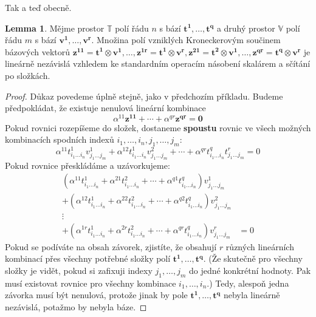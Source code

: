 \documentclass[a5paper,12pt]{amsbook}
\theoremstyle{definition}
\newtheorem{lemma}[theorem]{Lemma}
\newcommand{\myvec}[1]{\mathbf{#1}}
\newcommand{\myspace}[1]{\mathbb{#1}}
\begin{document}
\noindent
Tak a teď obecně.

\begin{lemma}
Mějme prostor $\myspace{T}$ polí řádu $n$ s bází $\myvec{t^1},\hdots,\myvec{t^q}$
a druhý prostor $\myspace{V}$ polí řádu $m$ s bází $\myvec{v^1},\hdots,\myvec{v^r}$.
Množina polí vzniklých Kroneckerovým součinem bázových vektorů $\myvec{z^{11}} = \myvec{t^1}\otimes\myvec{v^1},
\hdots,\myvec{z^{1r}} = \myvec{t^1}\otimes\myvec{v^r},\myvec{z^{21}} = \myvec{t^2}\otimes\myvec{v^1},\hdots,
\myvec{z^{qr}} = \myvec{t^q}\otimes\myvec{v^r}$ je lineárně nezávislá vzhledem ke standardním operacím
násobení skalárem a sčítání po složkách.
\end{lemma}

\begin{proof}
Důkaz povedeme úplně stejně, jako v předchozím příkladu. Budeme předpokládat, že existuje nenulová lineární
kombinace
\begin{equation*}
\alpha^{11}\myvec{z^{11}} + \cdots + \alpha^{qr}\myvec{z^{qr}} = \myvec{0}
\end{equation*}
Pokud rovnici rozepíšeme do složek, dostaneme \textbf{spoustu} rovnic ve všech možných kombinacích spodních
indexů $i_1,\hdots,i_n,j_1,\hdots,j_m$:
\begin{equation*}
\alpha^{11}t^1_{i_1\hdots i_n}v^1_{j_1\hdots j_m} + \alpha^{12}t^1_{i_1\hdots i_n}v^2_{j_1\hdots j_m} + \cdots 
+ \alpha^{qr}t^q_{i_1\hdots i_n}t^r_{j_1\hdots j_m} = 0
\end{equation*}
Pokud rovnice přeskládáme a uzávorkujeme:
\begin{equation*}
\begin{split}
(\alpha^{11}t^1_{i_1\hdots i_n} + \alpha^{21}t^2_{i_1\hdots i_n} + \cdots + \alpha^{q1}t^q_{i_1\hdots i_n})v^1_{j_1\hdots j_m} & \\
+ (\alpha^{12}t^1_{i_1\hdots i_n} + \alpha^{22}t^2_{i_1\hdots i_n} + \cdots + \alpha^{q2}t^q_{i_1\hdots i_n})v^2_{j_1\hdots j_m} & \\
\vdots & \\
+ (\alpha^{1r}t^1_{i_1\hdots i_n} + \alpha^{2r}t^2_{i_1\hdots i_n} + \cdots + \alpha^{qr}t^q_{i_1\hdots i_n})v^r_{j_1\hdots j_m} & = 0
\end{split}
\end{equation*}
Pokud se podíváte na obsah závorek, zjistíte, že obsahují $r$ různých lineárních kombinací přes všechny potřebné složky polí
$\myvec{t^1},\hdots,\myvec{t^q}$. (Že skutečně pro všechny složky je vidět, pokud si zafixuji indexy $j_1,\hdots,j_m$ do jedné
konkrétní hodnoty. Pak musí existovat rovnice pro všechny kombinace $i_1,\hdots,i_n$.) Tedy, alespoň jedna závorka musí být nenulová,
protože jinak by pole $\myvec{t^1},\hdots,\myvec{t^q}$ nebyla lineárně nezávislá, potažmo by nebyla báze.


\end{proof}
\end{document}
